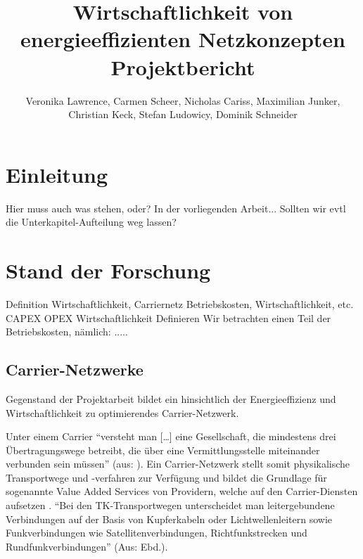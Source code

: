 \documentclass[12pt,titlepage]{article}
\newcommand{\firstpages}{

     \newpage
     \tableofcontents{}
     \addtocontents{toc}{~\hfill\textbf{Seite}\par}

     \newpage
     \listoffigures

     \newpage
     \listoftables
     \newpage
}
\begin{document}
\title{\huge{Wirtschaftlichkeit von energieeffizienten Netzkonzepten} \\ \large{Projektbericht}} 
\author{Veronika Lawrence, Carmen Scheer, Nicholas Cariss, Maximilian Junker,\\ Christian Keck, Stefan Ludowicy, Dominik Schneider} 
\maketitle
\firstpages

\section{Einleitung}
Hier muss auch was stehen, oder? 
In der vorliegenden Arbeit...
Sollten wir evtl die Unterkapitel-Aufteilung weg lassen?


\section{Stand der Forschung} \label{SdF}
Definition Wirtschaftlichkeit, Carriernetz
Betriebskosten, Wirtschaftlichkeit, etc.
CAPEX OPEX
Wirtschaftlichkeit
Definieren
Wir betrachten einen Teil der Betriebskosten, nämlich: .....

\subsection{Carrier-Netzwerke} 

%

Gegenstand der Projektarbeit bildet ein hinsichtlich der Energieeffizienz und Wirtschaftlichkeit zu optimierendes Carrier-Netzwerk.

Unter einem Carrier "`versteht man […] eine Gesellschaft, die mindestens drei Übertra\-gungs\-wege betreibt, die über eine Vermittlungsstelle miteinander verbunden sein müssen"' (aus: \cite{carrier}). Ein Carrier-Netzwerk stellt somit physikalische Transportwege und -verfahren zur Verfügung und bildet die Grundlage für sogenannte Value Added Services von Providern, welche auf den Carrier-Diensten aufsetzen \cite{fassnacht}. "`Bei den TK-Transportwegen unterscheidet man leitergebundene Verbindungen auf der Basis von Kupferkabeln oder Lichtwellenleitern sowie Funkverbindungen wie Satellitenverbindungen, Richtfunkstrecken und Rundfunkverbindungen"' (Aus: Ebd.).%
\end{document}
